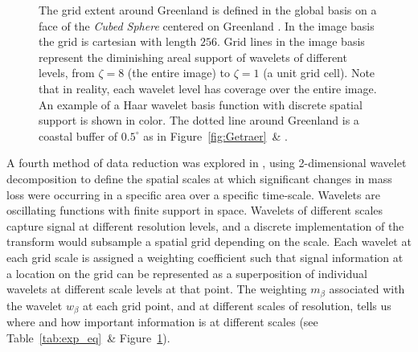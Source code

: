 {%
\begin{figure}
\centering
{}
\caption[The Wavelet Grid Around Greenland]{The grid extent around Greenland is defined in the global basis on a face of the \textit{Cubed Sphere} centered on Greenland \cite[see Figure~\ref{fig:gridbasins}~\textbf{A}~\&][]{ronchi1996}. In the image basis the grid is cartesian with length $256$. Grid lines in the image basis represent the diminishing areal support of wavelets of different levels, from $\zeta=8$ (the entire image) to $\zeta=1$ (a unit grid cell). Note that in reality, each wavelet level has coverage over the entire image. An example of a Haar wavelet basis function with discrete spatial support is shown in color. The dotted line around Greenland is a coastal buffer of $0.5^{\circ}$ as in Figure~\ref{fig:Getraer}~\& \cite{Harig+2016}.} \label{fig:thegrid}
\end{figure}

A fourth method of data reduction was explored in \cite{getraerSpring}, using 2-dimensional wavelet decomposition to define the spatial scales at which significant changes in mass loss were occurring in a specific area over a specific time-scale. Wavelets are oscillating functions with finite support in space. Wavelets of different scales capture signal at different resolution levels, and a discrete implementation of the transform would subsample a spatial grid depending on the scale. Each wavelet at each grid scale is assigned a weighting coefficient such that signal information at a location on the grid can be represented as a superposition of individual wavelets at different scale levels at that point. The weighting $m_{\beta}$ associated with the wavelet $w_{\beta}$ at each grid point, and at different scales of resolution, tells us where and how important information is at different scales (see Table~\ref{tab:exp_eq}~\& Figure~\ref{fig:thegrid}).



}
